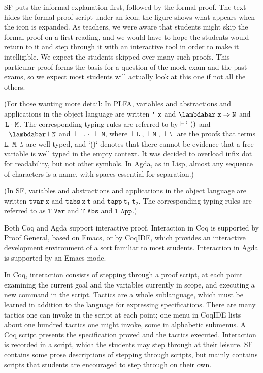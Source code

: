 \documentclass[preprint,authoryear]{elsarticle}
\begin{document}
SF puts the informal explanation first, followed by the formal proof. The text
hides the formal proof script under an icon; the figure shows what appears when
the icon is expanded. As teachers, we were aware that students might skip the
formal proof on a first reading, and we would have to hope the students would
return to it and step through it with an interactive tool in order to make it
intelligible.  We expect the students skipped over many such proofs.  This
particular proof forms the basis for a question of the mock exam and the past
exams, so we expect most students will actually look at this one if not all the
others.

\newcommand{\ex}{\texttt{x}}
\newcommand{\why}{\texttt{y}}
\newcommand{\EL}{\texttt{L}}
\newcommand{\EM}{\texttt{M}}
\newcommand{\EN}{\texttt{N}}
\newcommand{\tee}{\texttt{t}}
\newcommand{\tick}{\texttt{\lq}}
\newcommand{\GG}{\Gamma}
\newcommand{\AY}{\texttt{A}}
\newcommand{\BE}{\texttt{B}}

(For those wanting more detail: In PLFA, variables and abstractions and
applications in the object language are written $\tick\;\ex$ and
$\lambdabar\;\ex\;{\Rightarrow}\;\EN$ and $\EL\;{\cdot}\;\EM$.  The
corresponding typing rules are referred to by ${\vdash}\tick\;()$
and ${\vdash}\lambdabar\;{\vdash}\EN$ and ${\vdash}\EL\;{\cdot}\;{\vdash}\EM$, where
${\vdash}\EL$, ${\vdash}\EM$, ${\vdash}\EN$ are the proofs that terms
$\EL$, $\EM$, $\EN$ are well typed, and `()` denotes that there cannot
be evidence that a free variable is well typed in the empty context.
It was decided to overload infix dot for readability, but not other
symbols. In Agda, as in Lisp, almost any sequence of characters is a
name, with spaces essential for separation.)

(In SF, variables and abstractions and applications in
the object language are written $\texttt{tvar}~\ex$ and
$\texttt{tabs}~\ex~\tee$ and $\texttt{tapp}~\tee_1~\tee_2$.
The corresponding typing rules are referred to as
$\texttt{T\_Var}$ and $\texttt{T\_Abs}$ and $\texttt{T\_App}$.)

Both Coq and Agda support interactive proof.  Interaction in Coq is
supported by Proof General, based on Emacs, or by CoqIDE, which
provides an interactive development environment of a sort familiar to
most students.  Interaction in Agda is supported by an Emacs mode.

In Coq, interaction consists of stepping through a proof script, at
each point examining the current goal and the variables currently in
scope, and executing a new command in the script.  Tactics are a whole
sublanguage, which must be learned in addition to the language for
expressing specifications.  There are many tactics one can invoke in
the script at each point; one menu in CoqIDE lists about one hundred
tactics one might invoke, some in alphabetic submenus.  A Coq
script presents the specification proved and the tactics executed.
Interaction is recorded in a script, which the students
may step through at their leisure.  SF contains some prose descriptions
of stepping through scripts, but mainly contains scripts that students
are encouraged to step through on their own.
\end{document}
